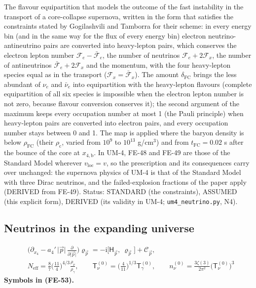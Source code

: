 \documentclass[
  10pt,
]{article}
\begin{document}
The flavour equipartition that models the outcome of the fast
instability in the transport of a core-collapse supernova, written in
the form that satisfies the constraints stated by Gogilashvili and
Tamborra for their scheme: in every energy bin (and in the same way for
the flux of every energy bin) electron neutrino-antineutrino pairs are
converted into heavy-lepton pairs, which conserves the electron lepton
number \(\mathcal{F}_{e} - \bar{\mathcal{F}}_{e}\), the number of
neutrinos \(\mathcal{F}_{e} + 2\mathcal{F}_{x}\), the number of
antineutrinos \(\bar{\mathcal{F}}_{e} + 2\mathcal{F}_{x}\) and the
momentum, with the four heavy-lepton species equal as in the transport
(\(\mathcal{F}_{x} = \bar{\mathcal{F}}_{x}\)). The amount
\(\delta_{\mathrm{FC}}\) brings the less abundant of \(\nu_e\) and
\(\bar\nu_e\) into equipartition with the heavy-lepton flavours
(complete equipartition of all six species is impossible when the
electron lepton number is not zero, because flavour conversion conserves
it); the second argument of the maximum keeps every occupation number at
most 1 (the Pauli principle) when heavy-lepton pairs are converted into
electron pairs, and every occupation number stays between 0 and 1. The
map is applied where the baryon density is below \(\rho_{\mathrm{FC}}\)
(their \(\rho_{\mathrm{c}}\), varied from \(10^9\) to \(10^{13}\)
g/cm\(^3\)) and from \(t_{\mathrm{FC}} = 0.02\) s after the bounce of
the core at \(x_{4,\mathrm{b}}\). In UM-4, FE-48 and FE-49 are those of
the Standard Model wherever \(v_{\mathrm{loc}} = v\), so the
prescription and its consequences carry over unchanged: the supernova
physics of UM-4 is that of the Standard Model with three Dirac
neutrinos, and the failed-explosion fractions of the paper apply
(DERIVED from FE-49). Status: STANDARD (the constraints), ASSUMED (this
explicit form), DERIVED (its validity in UM-4;
\texttt{um4\_neutrino.py}, N4).

\hypertarget{neutrinos-in-the-expanding-universe}{%
\subsection{Neutrinos in the expanding
universe}\label{neutrinos-in-the-expanding-universe}}

\[
\begin{aligned}
&\Big(\partial_{x_4} - a_4'\,\lvert\vec p\rvert\,\frac{\partial}{\partial\lvert\vec p\rvert}\Big)\varrho_{\vec p}
 = -\mathrm{i}\big[\mathsf{H}_{\vec p},\ \varrho_{\vec p}\big] + \mathcal{C}_{\vec p},\\
&N_{\mathrm{eff}} = \frac87\Big(\frac{11}{4}\Big)^{4/3}\frac{\rho_\nu}{\rho_\gamma},\qquad
 \mathsf{T}_\nu^{(0)} = \Big(\frac{4}{11}\Big)^{1/3}\mathsf{T}_\gamma^{(0)},\qquad
 n_\nu^{(0)} = \frac{3\zeta(3)}{2\pi^2}\big(\mathsf{T}_\nu^{(0)}\big)^3
\end{aligned} \tag{FE-53}
\] \textbf{Symbols in (FE-53).}
\end{document}

